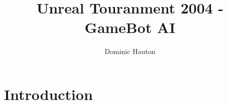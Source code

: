 \documentclass[a4paper,12pt,twocolumn]{report}
\title{Unreal Touranment 2004 - GameBot AI}
\author{Dominic Hauton}
\begin{document}
\maketitle


\section{Introduction}


\end{document}
